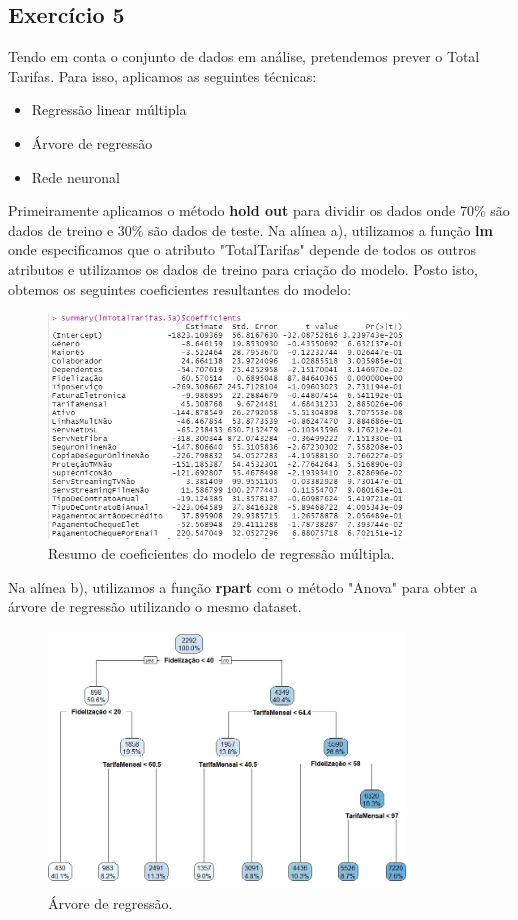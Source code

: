 \subsection{Exercício 5}
Tendo em conta o conjunto de dados em análise, pretendemos prever o Total Tarifas. Para isso, aplicamos as seguintes técnicas: 
\begin{itemize}
\item Regressão linear múltipla
\item Árvore de regressão
\item Rede neuronal
\end{itemize}
Primeiramente aplicamos o método \textbf{hold out} para dividir os dados onde 70\% são dados de treino e 30\% são dados de teste.
Na alínea a), utilizamos a função \textbf{lm} onde especificamos que o atributo "TotalTarifas" depende de todos os outros atributos e utilizamos os dados de treino para criação do modelo. Posto isto, obtemos os seguintes coeficientes resultantes do modelo:

\begin{figure}[htbp]
\centerline{\includegraphics[width=9.5cm]{images/5a_coeficientes.jpg}}
\caption{Resumo de coeficientes do modelo de regressão múltipla.}
\label{5a_coeficientes}
\end{figure}

Na alínea b), utilizamos a função \textbf{rpart} com o método "Anova" para obter a árvore de regressão utilizando o mesmo dataset.

\begin{figure}[htbp]
\centerline{\includegraphics[width=9.5cm]{images/5b_arvore_regressao.jpg}}
\caption{Árvore de regressão.}
\label{5b_arvore_regressao}
\end{figure}

